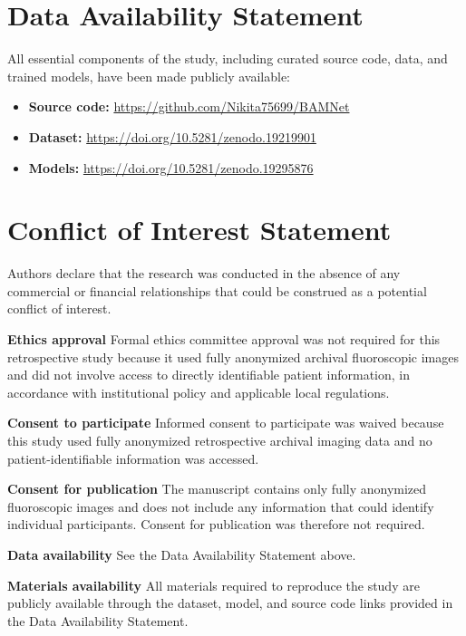 \documentclass[oneside,pdflatex,sn-mathphys-num]{sn-jnl}
\begin{document}
\section*{Data Availability Statement}

All essential components of the study, including curated source code, data, and trained models, have been made publicly available:

\begin{itemize}
\item \textbf{Source code:} \url{https://github.com/Nikita75699/BAMNet}
\item \textbf{Dataset:} \url{https://doi.org/10.5281/zenodo.19219901}
\item \textbf{Models:} \url{https://doi.org/10.5281/zenodo.19295876}
\end{itemize}

\section*{Conflict of Interest Statement}

Authors declare that the research was conducted in the absence of any commercial or financial relationships that could be construed as a potential conflict of interest.

\noindent\textbf{Ethics approval} Formal ethics committee approval was not required for this retrospective study because it used fully anonymized archival fluoroscopic images and did not involve access to directly identifiable patient information, in accordance with institutional policy and applicable local regulations.

\noindent\textbf{Consent to participate} Informed consent to participate was waived because this study used fully anonymized retrospective archival imaging data and no patient-identifiable information was accessed.

\noindent\textbf{Consent for publication} The manuscript contains only fully anonymized fluoroscopic images and does not include any information that could identify individual participants. Consent for publication was therefore not required.

\noindent\textbf{Data availability} See the Data Availability Statement above.

\noindent\textbf{Materials availability} All materials required to reproduce the study are publicly available through the dataset, model, and source code links provided in the Data Availability Statement.
\end{document}
